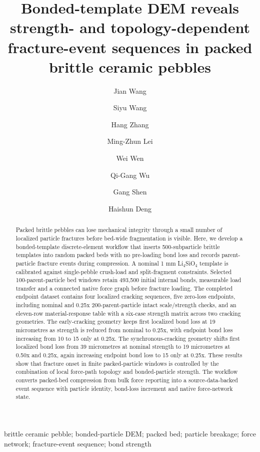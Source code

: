 \documentclass[preprint,12pt]{elsarticle}
\begin{document}
\begin{frontmatter}
\title{\texorpdfstring{Bonded-template DEM reveals strength- and topology-dependent fracture-event sequences in packed brittle ceramic pebbles}{Bonded-template DEM reveals strength- and topology-dependent fracture-event sequences in packed brittle ceramic pebbles}}
\author[aff1,aff2]{Jian Wang}
\author[aff1]{Siyu Wang}
\author[aff1]{Hang Zhang}
\author[aff2]{Ming-Zhun Lei}
\author[aff1,aff2]{Wei Wen}
\author[aff2]{Qi-Gang Wu}
\author[aff1]{Gang Shen}
\author[aff1]{Haishun Deng}
\address[aff1]{Anhui University of Science and Technology, Huainan, Anhui 232001, China}
\address[aff2]{Institute of Plasma Physics, Chinese Academy of Sciences, Hefei, Anhui 230031, China}










\begin{abstract}

Packed brittle pebbles can lose mechanical integrity through a small number of localized particle fractures before bed-wide fragmentation is visible. Here, we develop a bonded-template discrete-element workflow that inserts 500-subparticle brittle templates into random packed beds with no pre-loading bond loss and records parent-particle fracture events during compression. A nominal 1 mm Li$_4$SiO$_4$ template is calibrated against single-pebble crush-load and split-fragment constraints. Selected 100-parent-particle bed windows retain 493,500 initial internal bonds, measurable load transfer and a connected native force graph before fracture loading. The completed endpoint dataset contains four localized cracking sequences, five zero-loss endpoints, including nominal and 0.25x 200-parent-particle intact scale/strength checks, and an eleven-row material-response table with a six-case strength matrix across two cracking geometries. The early-cracking geometry keeps first localized bond loss at 19 micrometres as strength is reduced from nominal to 0.25x, with endpoint bond loss increasing from 10 to 15 only at 0.25x. The synchronous-cracking geometry shifts first localized bond loss from 39 micrometres at nominal strength to 19 micrometres at 0.50x and 0.25x, again increasing endpoint bond loss to 15 only at 0.25x. These results show that fracture onset in finite packed-particle windows is controlled by the combination of local force-path topology and bonded-particle strength. The workflow converts packed-bed compression from bulk force reporting into a source-data-backed event sequence with particle identity, bond-loss increment and native force-network state.


\end{abstract}

\begin{keyword}
brittle ceramic pebble; bonded-particle DEM; packed bed; particle breakage; force network; fracture-event sequence; bond strength
\end{keyword}
\end{frontmatter}
\end{document}
